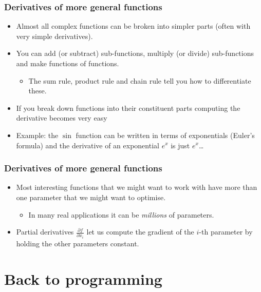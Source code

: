 \documentclass[\beamerclass]{beamer}
\begin{document}
\begin{frame}
\frametitle{Derivatives of more general functions}

\begin{itemize}
	\item<1-> Almost all complex functions can be broken into simpler parts (often with very simple derivatives).
	\item<1-> You can add (or subtract) sub-functions, multiply (or divide) sub-functions and make functions of functions.
	\begin{itemize}
		\item The sum rule, product rule and chain rule tell you how to differentiate these.
	\end{itemize}
	\item<2-> If you break down functions into their constituent parts computing the derivative becomes very easy
	\item<2-> Example: the $\sin$ function can be written in terms of exponentials (Euler's formula) and the derivative of an exponential $e^x$ is just $e^x$\dots
\end{itemize}
\end{frame}

\begin{frame}
\frametitle{Derivatives of more general functions}

\begin{itemize}
	\item<1-> Most interesting functions that we might want to work with have more than one parameter that we might want to optimise.
	\begin{itemize}
		\item<1-> In many real applications it can be \emph{millions} of parameters.
	\end{itemize}
	\item<2-> Partial derivatives $\frac{\partial f}{\partial x_i}$ let us compute the gradient of the $i$-th parameter by holding the other parameters constant.
\end{itemize}
\end{frame}

\section{Back to programming}
\end{document}
